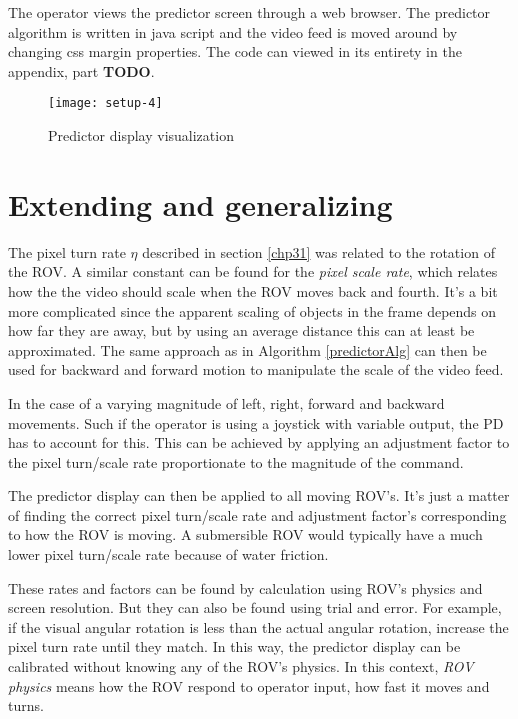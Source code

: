 The operator views the predictor screen through a web browser. The predictor algorithm is written in java script and the video feed is moved around by changing css margin properties. The code can viewed in its entirety in the appendix, part \textbf{TODO}.

\begin{figure}[h!]
    \centering
    \texttt{[image: setup-4]}
    \caption{Predictor display visualization}
    \label{predictorvis}
\end{figure}

\section{Extending and generalizing}\label{expand}

The pixel turn rate $\eta$ described in section \ref{chp31} was related to the rotation of the ROV. A similar constant can be found for the \emph{pixel scale rate}, which relates how the the video should scale when the ROV moves back and fourth. It's a bit more complicated since the apparent scaling of objects in the frame depends on how far they are away, but by using an average distance this can at least be approximated. The same approach as in Algorithm \ref{predictorAlg} can then be used for backward and forward motion to manipulate the scale of the video feed.

In the case of a varying magnitude of left, right, forward and backward movements. Such if the operator is using a joystick with variable output, the PD has to account for this. This can be achieved by applying an adjustment factor to the pixel turn/scale rate proportionate to the magnitude of the command.

The predictor display can then be applied to all moving ROV's. It's just a matter of finding the correct pixel turn/scale rate and adjustment factor's corresponding to how the ROV is moving. A submersible ROV would typically have a much lower pixel turn/scale rate because of water friction.

These rates and factors can be found by calculation using ROV's physics and screen resolution. But they can also be found using trial and error. For example, if the visual angular rotation is less than the actual angular rotation, increase the pixel turn rate until they match. In this way, the predictor display can be calibrated without knowing any of the ROV's physics. In this context, \emph{ROV physics} means how the ROV respond to operator input, how fast it moves and turns.